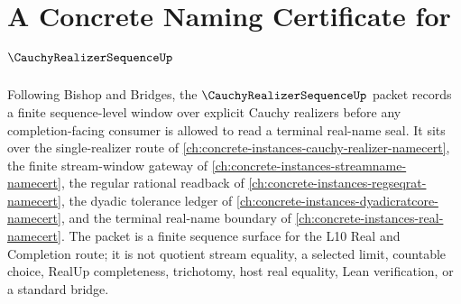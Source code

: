 \chapter{A Concrete Naming Certificate for $\CauchyRealizerSequenceUp$}
\label{ch:concrete-instances-cauchy-realizer-sequence-namecert}

Following Bishop and Bridges, the $\CauchyRealizerSequenceUp$ packet records a finite sequence-level window over explicit Cauchy realizers before any completion-facing consumer is allowed to read a terminal real-name seal. It sits over the single-realizer route of \autoref{ch:concrete-instances-cauchy-realizer-namecert}, the finite stream-window gateway of \autoref{ch:concrete-instances-streamname-namecert}, the regular rational readback of \autoref{ch:concrete-instances-regseqrat-namecert}, the dyadic tolerance ledger of \autoref{ch:concrete-instances-dyadicratcore-namecert}, and the terminal real-name boundary of \autoref{ch:concrete-instances-real-namecert}. The packet is a finite sequence surface for the L10 Real and Completion route; it is not quotient stream equality, a selected limit, countable choice, RealUp completeness, trichotomy, host real equality, Lean verification, or a standard bridge.

